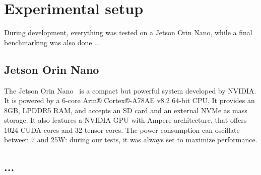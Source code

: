 \chapter{Experimental setup}
\label{chap:experim-setup}

During development, everything was tested on a Jetson Orin Nano, while a final benchmarking was also done ...

\section{Jetson Orin Nano}

The Jetson Orin Nano~\cite{jetson} is a compact but powerful system developed by NVIDIA.
It is powered by a 6-core Arm® Cortex®-A78AE v8.2 64-bit CPU.
It provides an 8GB, LPDDR5 RAM, and accepts an SD card and an external NVMe as mass storage.
It also features a NVIDIA GPU with Ampere architecture, that offers 1024 CUDA cores and 32 tensor cores.
The power consumption can oscillate between 7 and 25W: during our tests, it was always set to maximize performance. 

\section{...}
